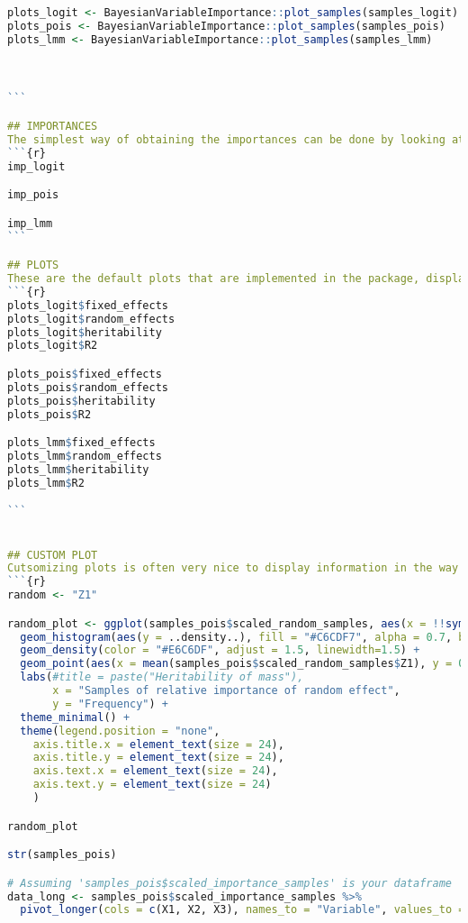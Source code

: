 \begin{lstlisting}[language=R, caption=Usage of the BayesianImpGLMM package with plots and examples.]
plots_logit <- BayesianVariableImportance::plot_samples(samples_logit)
plots_pois <- BayesianVariableImportance::plot_samples(samples_pois)
plots_lmm <- BayesianVariableImportance::plot_samples(samples_lmm)



```

## IMPORTANCES
The simplest way of obtaining the importances can be done by looking at these objects. Note that these are sampled, so they do not represent the mean of the samples used for plotting further down.
```{r}
imp_logit

imp_pois

imp_lmm
```

## PLOTS
These are the default plots that are implemented in the package, displaying the importance of all effects and $R^2$ metrics.
```{r}
plots_logit$fixed_effects
plots_logit$random_effects
plots_logit$heritability
plots_logit$R2

plots_pois$fixed_effects
plots_pois$random_effects
plots_pois$heritability
plots_pois$R2

plots_lmm$fixed_effects
plots_lmm$random_effects
plots_lmm$heritability
plots_lmm$R2

```


## CUSTOM PLOT
Cutsomizing plots is often very nice to display information in the way you want it. Therefore, we show how one can customize the plots using ggplot2 based on the samples drawn.
```{r}
random <- "Z1"

random_plot <- ggplot(samples_pois$scaled_random_samples, aes(x = !!sym(random))) +
  geom_histogram(aes(y = ..density..), fill = "#C6CDF7", alpha = 0.7, bins = 40, color = "black") +
  geom_density(color = "#E6C6DF", adjust = 1.5, linewidth=1.5) +
  geom_point(aes(x = mean(samples_pois$scaled_random_samples$Z1), y = 0), color = "#E6C6DF", size = 4) +
  labs(#title = paste("Heritability of mass"),
       x = "Samples of relative importance of random effect",
       y = "Frequency") +
  theme_minimal() +
  theme(legend.position = "none",
    axis.title.x = element_text(size = 24),
    axis.title.y = element_text(size = 24),
    axis.text.x = element_text(size = 24),
    axis.text.y = element_text(size = 24)
    ) 

random_plot

str(samples_pois)

# Assuming 'samples_pois$scaled_importance_samples' is your dataframe
data_long <- samples_pois$scaled_importance_samples %>%
  pivot_longer(cols = c(X1, X2, X3), names_to = "Variable", values_to = "Value")


\end{lstlisting}

